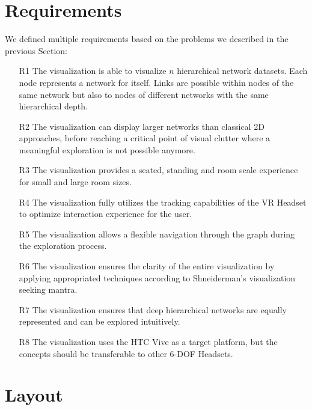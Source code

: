 \section{Requirements}
\label{chap:ps-requirements}
We defined multiple requirements based on the problems we described in the previous Section:\\
\begin{enumerate}
    \item[R1]\label{req:R1} The visualization is able to visualize $n$ hierarchical network datasets. Each node represents a network for itself. Links are possible within nodes of the same network but also to nodes of different networks with the same hierarchical depth.
    \item[R2]\label{req:R2} The visualization can display larger networks than classical 2D approaches, before reaching a critical point of visual clutter where a meaningful exploration is not possible anymore.
    \item[R3]\label{req:R3} The visualization provides a seated, standing and room scale experience for small and large room sizes.
    \item[R4]\label{req:R4} The visualization fully utilizes the tracking capabilities of the VR Headset to optimize interaction experience for the user.
    \item[R5]\label{req:R5} The visualization allows a flexible navigation through the graph during the exploration process.
    \item[R6]\label{req:R6} The visualization ensures the clarity of the entire visualization by applying appropriated techniques according to Shneiderman's visualization seeking mantra.
    \item[R7]\label{req:R7} The visualization ensures that deep hierarchical networks are equally represented and can be explored intuitively.
    \item[R8]\label{req:R8} The visualization uses the HTC Vive as a target platform, but the concepts should be transferable to other 6-DOF Headsets. 
\end{enumerate}

\section{Layout}
\label{chap:ps-layout}

